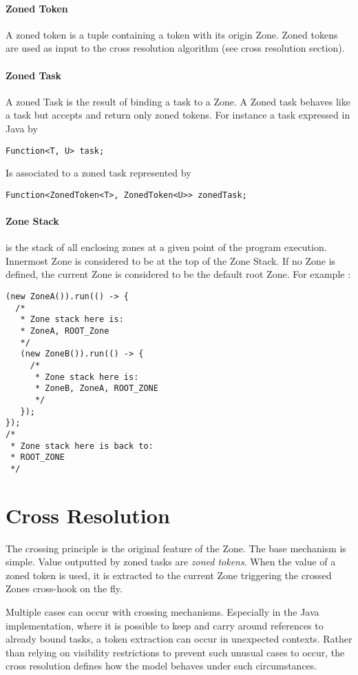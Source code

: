 \paragraph{Zoned Token} A zoned token is a tuple containing a token with its origin Zone. Zoned tokens are used as input to the cross resolution algorithm (see cross resolution section).

\paragraph{Zoned Task} A zoned Task is the result of binding a task to a Zone. A Zoned task behaves like a task but accepts and return only zoned tokens. For instance a task expressed in Java by
\begin{lstlisting}
Function<T, U> task;
\end{lstlisting}
Is associated to a zoned task represented by
\begin{lstlisting}
Function<ZonedToken<T>, ZonedToken<U>> zonedTask;
\end{lstlisting}

\paragraph{Zone Stack} is the stack of all enclosing zones at a given point of the program execution. Innermost Zone is considered to be at the top of the Zone Stack. If no Zone is defined, the current Zone is considered to be the default root Zone. For example :

\begin{lstlisting}
(new ZoneA()).run(() -> {
  /*
   * Zone stack here is:
   * ZoneA, ROOT_Zone
   */
   (new ZoneB()).run(() -> {
     /*
      * Zone stack here is:
      * ZoneB, ZoneA, ROOT_ZONE
      */
   });
});
/*
 * Zone stack here is back to:
 * ROOT_ZONE
 */
\end{lstlisting}

\section{Cross Resolution}

The crossing principle is the original feature of the Zone. The base mechanism is simple. Value outputted by zoned tasks are \emph{zoned tokens}. When the value of a zoned token is used, it is extracted to the current Zone triggering the crossed Zones cross-hook on the fly.

Multiple cases can occur with crossing mechanisms. Especially in the Java implementation, where it is possible to keep and carry around references to already bound tasks, a token extraction can occur in unexpected contexts. Rather than relying on visibility restrictions to prevent such unusual cases to occur, the cross resolution defines how the model behaves under such circumstances.

